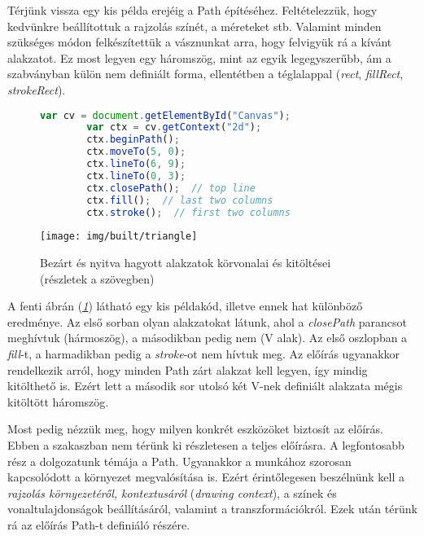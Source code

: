 \documentclass[12pt]{report}
\theoremstyle{definition}
\newcommand{\inenglish}[1]{\textsl{#1}}
\newcommand{\func}[1]{{\textsl{#1}}}
\begin{document}
Térjünk vissza egy kis példa erejéig a Path építéséhez. Feltételezzük, hogy
kedvünkre beállítottuk a rajzolás színét, a méreteket stb. Valamint minden
szükséges módon felkészítettük a vásznunkat arra, hogy felvigyük rá a kívánt
alakzatot. Ez most legyen egy háromszög, mint az egyik legegyszerűbb, ám a
szabványban külön nem definiált forma, ellentétben a téglalappal (\emph{rect},
\emph{fillRect}, \emph{strokeRect}).

  \begin{figure}[!htb]
    \hspace{0.1\textwidth}
      \centering
      \begin{lstlisting}[language=JavaScript, autogobble=true]
        var cv = document.getElementById("Canvas");
        var ctx = cv.getContext("2d");
        ctx.beginPath();
        ctx.moveTo(5, 0);
        ctx.lineTo(6, 9);
        ctx.lineTo(0, 3);
        ctx.closePath();  // top line
        ctx.fill();  // last two columns
        ctx.stroke();  // first two columns
      \end{lstlisting}
    \endminipage
    \hfill
      \texttt{[image: img/built/triangle]}
    \endminipage
    \caption{\label{fig:triangles} Bezárt és nyitva hagyott
    alakzatok körvonalai és kitöltései \\ (részletek a szövegben)}
  \end{figure}

A fenti ábrán (\emph{\ref{fig:triangles}}) látható egy kis példakód,
illetve ennek hat különböző eredménye. Az első sorban olyan alakzatokat látunk,
ahol a \func{closePath} parancsot meghívtuk (hármoszög), a másodikban pedig nem
(V alak). Az első oszlopban a \func{fill}-t, a harmadikban pedig a
\func{stroke}-ot nem hívtuk meg. Az előírás ugyanakkor rendelkezik arról, hogy
minden Path zárt alakzat kell legyen, így mindig kitölthető is. Ezért lett a
második sor utolsó két V-nek definiált alakzata mégis kitöltött háromszög.

Most pedig nézzük meg, hogy milyen konkrét eszközöket biztosít az előírás.
Ebben a szakaszban nem térünk ki részletesen a teljes előírásra. A legfontosabb
rész a dolgozatunk témája a Path. Ugyanakkor a munkához szorosan kapcsolódott a
környezet megvalósítása is. Ezért érintőlegesen beszélnünk kell a
\emph{rajzolás környezetéről, kontextusáról} (\inenglish{drawing context}), a
színek és vonaltulajdonságok beállításáról, valamint a transzformációkról. Ezek
után térünk rá az előírás Path-t definiáló részére.
\end{document}
